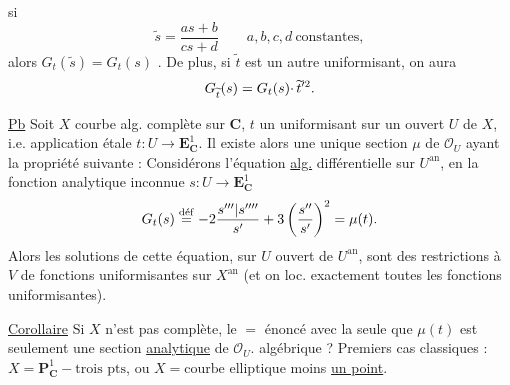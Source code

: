 si 
\[
\widetilde s=\frac{as+b}{cs+d}\qquad a,b,c,d\ \text{constantes},
\]
alors $G_t(\widetilde s)=G_t(s)$ \unsure{\ldots}. De plus, si $\widetilde t$ est un autre uniformisant, on aura
\[
G_{\widetilde t}(s)=G_t(s){{\cdot}}\,\widetilde t'^2.
\]

\uline{Pb} Soit $X$ courbe alg. complète sur $\mathbf C$, $t$ un uniformisant sur un ouvert $U$ de $X$, i.e. application étale $t:U\longrightarrow\mathbf E^1_{\mathbf C}$. Il existe alors une unique section $\mu$ de $\mathcal O_U$ ayant la propriété suivante : Considérons l'équation \uline{alg.} différentielle sur $U^{\mathrm{an}}$, en la fonction analytique inconnue $s:U\longrightarrow\mathbf E^1_{\mathbf C}$
\[
G_t(s)\overset{\mathrm{d\acute ef}}{=}-2\frac{{s'''|s''''}}{s'}+3\left(\frac{s''}{s'}\right)^2=\mu(t).
\]
Alors les solutions de cette équation, sur $U$
ouvert  de $U^{\mathrm{an}}$, sont des restrictions à $V$ de fonctions  uniformisantes sur $X^{\mathrm{an}}$ (et on   loc. exactement toutes les fonctions uniformisantes).

\uline{Corollaire} Si $X$ n'est pas complète, \unsure{\ldots} le $=$ énoncé avec la seule  que $\mu(t)$ est seulement une section \uline{analytique} de $\mathcal O_U$.   algébrique ? Premiers cas classiques : $X=\mathbf P^1_{\mathbf C}-\text{trois pts}$, ou $X=\text{courbe elliptique}$ moins \uline{un point}.

